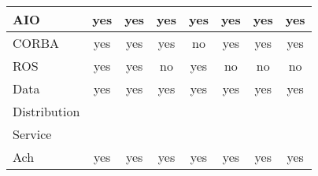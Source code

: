 \begin{table}
\begin{tabular}{l || c | c | c | c | c | c | c}
\hline
AIO                             & yes         & yes             & yes          & yes       & yes         & yes     & yes \\
\hline
CORBA                           & yes         & yes             & yes          & no        & yes         & yes     & yes \\
\hline
ROS                             & yes         & yes             & no           & yes       & no          & no      & no \\
\hline
Data                            & yes         & yes             & yes          & yes       & yes         & yes     & yes\\
Distribution                    &             &                 &              &           &             &         &     \\
Service                         &             &                 &              &           &             &         &     \\
\hline
Ach                             & yes         & yes             & yes          & yes       & yes         & yes     & yes\\


\hline
\end{tabular}
\normalsize
\end{table}
